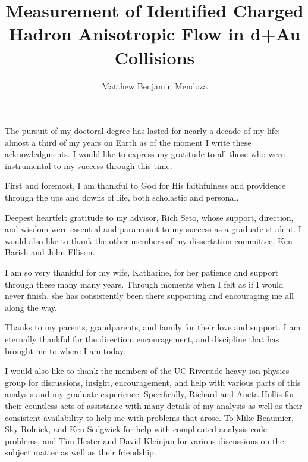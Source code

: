 \documentclass[oneside,final, letterpaper]{ucr}
\begin{document}
\dsp

\title{Measurement of Identified Charged Hadron Anisotropic Flow in d+Au Collisions}
\author{Matthew Benjamin Mendoza}

\maketitle
\copyrightpage{}
\approvalpage{}



\begin{acknowledgements}
The pursuit of my doctoral degree has lasted for nearly a decade of my life; almost a third of my years on Earth as of the moment I write these acknowledgments. I would like to express my gratitude to all those who were instrumental to my success through this time.

First and foremost, I am thankful to God for His faithfulness and providence through the ups and downs of life, both scholastic and personal.  

Deepest heartfelt gratitude to my advisor, Rich Seto, whose support, direction, and wisdom were essential and paramount to my success as a graduate student. I would also like to thank the other members of my dissertation committee, Ken Barish and John Ellison.

I am so very thankful for my wife, Katharine, for her patience and support through these many many years. Through moments when I felt as if I would never finish, she has consistently been there supporting and encouraging me all along the way.

Thanks to my parents, grandparents, and family for their love and support. I am eternally thankful for the direction, encouragement, and discipline that has brought me to where I am today. 

I would also like to thank the members of the UC Riverside heavy ion physics group for discussions, insight, encouragement, and help with various parts of this analysis and my graduate experience. Specifically, Richard and Aneta Hollis for their countless acts of assistance with many details of my analysis as well as their consistent availability to help me with problems that arose. To Mike Beaumier, Sky Rolnick, and Ken Sedgwick for help with complicated analysis code problems, and Tim Hester and David Kleinjan for various discussions on the subject matter as well as their friendship.


\end{acknowledgements}
\end{document}
